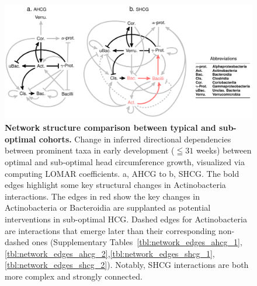 \documentclass[onecolumn,10pt]{IEEEtran}
\newcommand{\captionN}[1]{\caption{\color{darkgray} \sffamily \fontsize{9}{10}\selectfont #1  }}
\def\bact{Bacteroidia\xspace}
\def\actn{Actinobacteria\xspace}
\def\EXTENDEDDATA{Supplementary\xspace}
\begin{document}
\begin{figure}[!ht]
\centering
\includegraphics[width=.99\textwidth]{fig4.pdf}
\captionN{\textbf{Network structure comparison between typical and sub-optimal cohorts.} Change in inferred directional dependencies between prominent taxa in early development ($\leqq 31$ weeks) between optimal and sub-optimal head circumference growth, visualized via computing LOMAR coefficients. a, AHCG to b, SHCG. The bold edges highlight some key structural changes in \actn interactions. The edges in red show the key changes in \actn or \bact are supplanted as potential interventions in sub-optimal HCG. Dashed edges for \actn are interactions that emerge later than their corresponding non-dashed ones (\EXTENDEDDATA Tables~\ref{tbl:network_edges_ahcg_1},\ref{tbl:network_edges_ahcg_2},\ref{tbl:network_edges_shcg_1},\ref{tbl:network_edges_shcg_2}). Notably, SHCG interactions are both more complex and strongly connected.}
\label{fig:network}
\end{figure}
\end{document}
